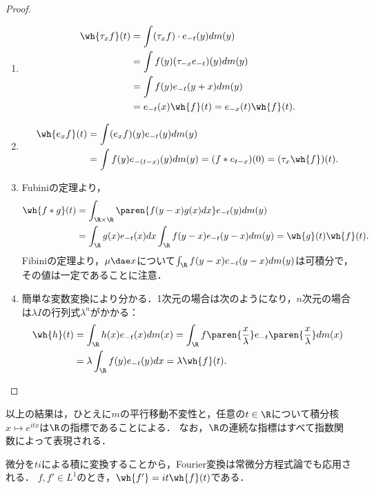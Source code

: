 \documentclass[uplatex,dvipdfmx]{jsreport}
\begin{document}
\begin{proof}\mbox{}
    \begin{enumerate}
        \item \begin{align*}
            \wh{\tau_xf}(t)&=\int(\tau_xf)\cdot e_{-t}(y)dm(y)\\
            &=\int f(y)(\tau_{-x}e_{-t})(y)dm(y)\\
            &=\int f(y)e_{-t}(y+x)dm(y)\\
            &=e_{-t}(x)\wh{f}(t)=e_{-x}(t)\wh{f}(t).
        \end{align*}
        \item \begin{align*}
            \wh{e_xf}(t)&=\int(e_xf)(y)e_{-t}(y)dm(y)\\
            &=\int f(y)e_{-(t-x)}(y)dm(y)=(f*e_{t-x})(0)=(\tau_x\wh{f})(t).
        \end{align*}
        \item Fubiniの定理より，
        \begin{align*}
            \wh{f*g}(t)&=\int_{\R\times\R}\paren{f(y-x)g(x)dx}e_{-t}(y)dm(y)\\
            &=\int_\R g(x)e_{-t}(x)dx\int_\R f(y-x)e_{-t}(y-x)dm(y)=\wh{g}(t)\wh{f}(t).
        \end{align*}
        Fibiniの定理より，$\mu\dae x$について$\int_\R f(y-x)e_{-t}(y-x)dm(y)$は可積分で，その値は一定であることに注意．
        \item 簡単な変数変換により分かる．1次元の場合は次のようになり，$n$次元の場合は$\lambda I$の行列式$\lambda^n$がかかる：
        \begin{align*}
            \wh{h}(t)&=\int_\R h(x)e_{-t}(x)dm(x)=\int_\R f\paren{\frac{x}{\lambda}}e_{-t}\paren{\frac{x}{\lambda}}dm(x)\\
            &=\lambda\int_\R f(y)e_{-t}(y)dx=\lambda\wh{f}(t).
        \end{align*}
    \end{enumerate}
\end{proof}
\begin{remarks}
    以上の結果は，ひとえに$m$の平行移動不変性と，任意の$t\in\R$について積分核$x\mapsto e^{itx}$は$\R$の指標であることによる．
    なお，$\R$の連続な指標はすべて指数関数によって表現される．
\end{remarks}

\begin{remark}[(6)の逆]
    微分を$ti$による積に変換することから，Fourier変換は常微分方程式論でも応用される．
    $f,f'\in L^1$のとき，$\wh{f'}=it\wh{f}(t)$である．
\end{remark}
\end{document}
